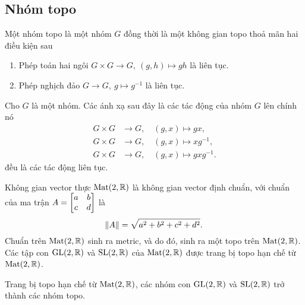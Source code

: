 \subsection{Nhóm topo}
\begin{defn}\label{defn 1.1.7}
    Một nhóm topo là một nhóm $G$ đồng thời là một không gian topo thoả mãn hai điều kiện sau
    \begin{enumerate}
        \item Phép toán hai ngôi $G\times G \to G,~(g,h)\mapsto gh$ là liên tục.
        \item Phép nghịch đảo $G\to G,~g \mapsto g^{-1}$ là liên tục.
    \end{enumerate}
\end{defn}
\begin{exam*}
    Cho $G$ là một nhóm. Các ánh xạ sau đây là các tác động của nhóm $G$ lên chính nó
    \begin{align*}
        G \times G &\to G,\quad (g,x)\mapsto gx,\\
        G \times G &\to G,\quad (g,x)\mapsto xg^{-1},\\
        G \times G &\to G,\quad (g,x)\mapsto gxg^{-1}.
    \end{align*}
    đều là các tác động liên tục.
\end{exam*}
Không gian vector thực $\operatorname{Mat}(2,\mathbb{R})$ là không gian vector định chuẩn, với chuẩn của ma trận $A = \begin{bmatrix} a & b \\ c & d \\ \end{bmatrix}$ là 
\[\norm{A} = \sqrt{a^2+b^2+c^2+d^2}.\]
Chuẩn trên $\operatorname{Mat}(2,\mathbb{R})$ sinh ra metric, và do đó, sinh ra một topo trên $\operatorname{Mat}(2,\mathbb{R})$. Các tập con $\operatorname{GL}(2,\mathbb{R})$ và $\operatorname{SL}(2,\mathbb{R})$ của $\operatorname{Mat}(2,\mathbb{R})$ được trang bị topo hạn chế từ $\operatorname{Mat}(2,\mathbb{R})$.
\begin{prop}\label{prop 1.1.9}
    Trang bị topo hạn chế từ $\operatorname{Mat}(2,\mathbb{R})$, các nhóm con $\operatorname{GL}(2,\mathbb{R})$ và $\operatorname{SL}(2,\mathbb{R})$ trở thành các nhóm topo.
\end{prop}
